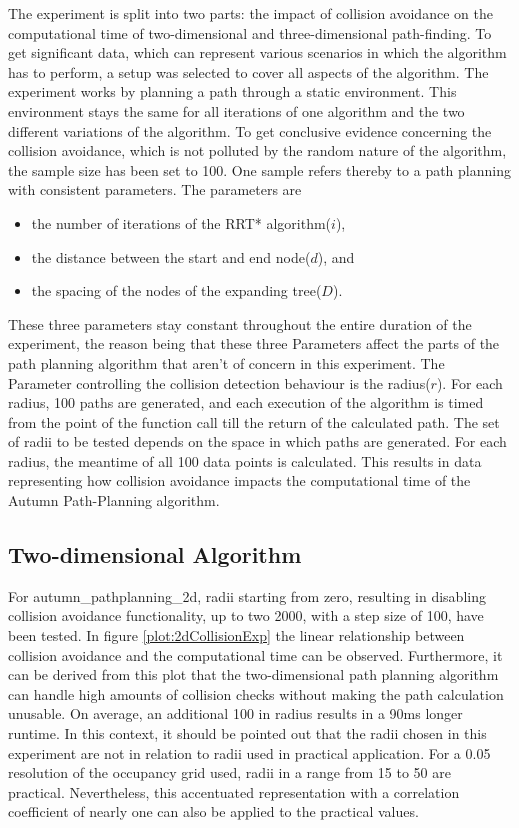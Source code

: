 The experiment is split into two parts: the impact of collision avoidance on the computational time of two-dimensional and three-dimensional path-finding.
To get significant data, which can represent various scenarios in which the algorithm has to perform, a setup was selected to cover all aspects of the algorithm. The experiment works by planning a path through a static environment. This environment stays the same for all iterations of one algorithm and the two different variations of the algorithm. To get conclusive evidence concerning the collision avoidance, which is not polluted by the random nature of the algorithm, the sample size has been set to 100. \newline One sample refers thereby to a path planning with consistent parameters. The parameters are
\begin{itemize}
	\item the number of iterations of the RRT* algorithm($i$),
	\item the distance between the start and end node($d$), and
	\item the spacing of the nodes of the expanding tree($D$).
\end{itemize}
These three parameters stay constant throughout the entire duration of the experiment, the reason being that these three Parameters affect the parts of the path planning algorithm that aren't of concern in this experiment. The Parameter controlling the collision detection behaviour is the radius($r$).
For each radius, 100 paths are generated, and each execution of the algorithm is timed from the point of the function call till the return of the calculated path. 
The set of radii to be tested depends on the space in which paths are generated.
For each radius, the meantime of all 100 data points is calculated. This results in data representing how collision avoidance impacts the computational time of the Autumn Path-Planning algorithm.

\subsection{Two-dimensional Algorithm}

For autumn\_pathplanning\_2d, radii starting from zero, resulting in disabling collision avoidance functionality, up to two 2000, with a step size of 100, have been tested. In figure \ref{plot:2dCollisionExp} the linear relationship between collision avoidance and the computational time can be observed. Furthermore, it can be derived from this plot that the two-dimensional path planning algorithm can handle high amounts of collision checks without making the path calculation unusable. On average, an additional 100 in radius results in a 90ms longer runtime. In this context, it should be pointed out that the radii chosen in this experiment are not in relation to radii used in practical application. For a 0.05 resolution of the occupancy grid used, radii in a range from 15 to 50 are practical. Nevertheless, this accentuated representation with a correlation coefficient of nearly one can also be applied to the practical values.   

